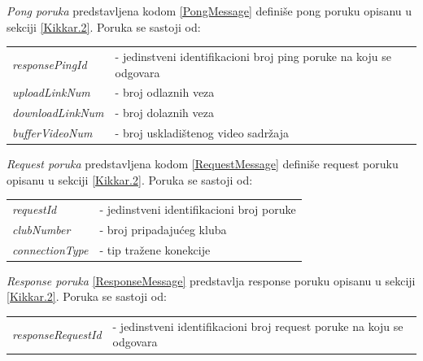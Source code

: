 \documentclass[12pt,oneside]{memoir}
\begin{document}
\textit{Pong poruka} predstavljena kodom \ref{PongMessage} definiše pong poruku opisanu u sekciji \ref{Kikkar.2}. Poruka se sastoji od:
 
\begin{center}
\begin{tabular}{ p{4cm} p{10cm} }
 \textit{responsePingId} & - jedinstveni identifikacioni broj ping poruke na koju se odgovara \\ 
 \textit{uploadLinkNum} & - broj odlaznih veza \\  
 \textit{downloadLinkNum} & - broj dolaznih veza \\
 \textit{bufferVideoNum} & - broj uskladištenog video sadržaja \\
\end{tabular}
\end{center}




\textit{Request poruka} predstavljena kodom \ref{RequestMessage} definiše request poruku opisanu u sekciji \ref{Kikkar.2}. Poruka se sastoji od:
 
\begin{center}
\begin{tabular}{ p{4cm} p{10cm} }
 \textit{requestId} & - jedinstveni identifikacioni broj poruke \\ 
 \textit{clubNumber} & - broj pripadajućeg kluba \\  
 \textit{connectionType} & - tip  tražene konekcije \\
\end{tabular}
\end{center}




\textit{Response poruka} \ref{ResponseMessage} predstavlja response poruku opisanu u sekciji \ref{Kikkar.2}. Poruka se sastoji od:
 
\begin{center}
\begin{tabular}{ p{4cm} p{10cm} }
 \textit{responseRequestId} & - jedinstveni identifikacioni broj request poruke na koju se odgovara \\ 
\end{tabular}
\end{center}



\end{document}
